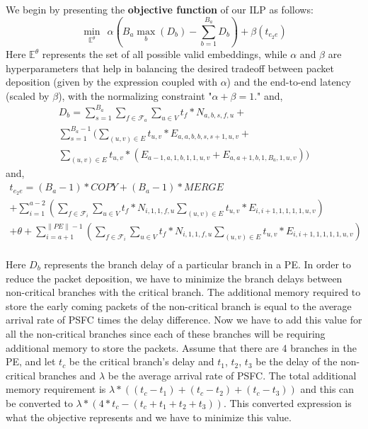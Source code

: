 \documentclass[journal]{IEEEtran}
\begin{document}
We begin by presenting the \textbf{objective function} of our ILP as follows:
\begin{equation}
\boxed{
\min_{\mathbb{E}^{\theta}}~~ \alpha\left(B_a \max_b \left( D_b \right) -  \sum_{b=1}^{B_a} D_b\right) + \beta \left(t_{e_2e}\right)} 
\end{equation}
Here $\mathbb{E}^{\theta}$ represents the set of all possible valid embeddings, while $\alpha$ and $\beta$ are hyperparameters that help in balancing the desired tradeoff between packet deposition (given by the expression coupled with $\alpha$) and the end-to-end latency (scaled by $\beta$), with the normalizing constraint "$\alpha + \beta = 1$."
and,
\begin{equation}
\begin{split}
    D_b = \sum_{s=1}^{B_a} \sum_{f \in \mathcal{F}_a} \sum_{u \in V} t_{f}*N_{a,b,s,f,u} +\\ \sum_{s=1}^{B_a -1}( \sum_{(u,v) \in E} t_{u,v}*E_{a,a,b,b,s,s+1,u,v} +\\ \sum_{(u,v) \in E} t_{u,v}*(E_{a-1,a,1,b,1,1,u,v} + E_{a,a+1,b,1,B_a,1,u,v}))
\end{split}
\end{equation}
and,
\begin{equation}
\begin{split}
    t_{e_2e} = (B_a - 1)*COPY + (B_a - 1)*MERGE \\+ \sum_{i=1}^{a-2} (\sum_{f \in \mathcal{F}_i} \sum_{u  \in V} t_f*N_{i,1,1,f,u} \sum_{(u,v) \in E} t_{u,v}*E_{i,i+1,1,1,1,1,u,v})\\ + \theta + \sum_{i=a+1}^{\lVert PE \rVert -1} (\sum_{f \in \mathcal{F}_i} \sum_{u  \in V} t_f*N_{i,1,1,f,u} \sum_{(u,v) \in E} t_{u,v}*E_{i,i+1,1,1,1,1,u,v})\\ 
\end{split}
\end{equation}

Here $D_b$ represents the branch delay of a particular branch in a PE. In order to reduce the packet deposition, we have to minimize the branch delays between non-critical branches with the critical branch. The additional memory required to store the early coming packets of the non-critical branch is equal to the average arrival rate of PSFC times the delay difference. Now we have to add this value for all the non-critical branches since each of these branches will be requiring additional memory to store the packets. Assume that there are 4 branches in the PE, and let $t_c$ be the critical branch's delay and $t_1$, $t_2$, $t_3$ be the delay of the non-critical branches and $\lambda$ be the average arrival rate of PSFC. The total additional memory requirement is $\lambda * ((t_c-t_1) + (t_c - t_2) + (t_c - t_3))$ and this can be converted to $\lambda * (4*t_c - (t_c + t_1 + t_2 + t_3))$. This converted expression is what the objective represents and we have to minimize this value.
\end{document}
